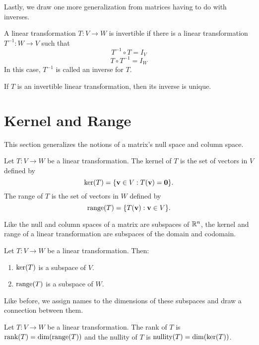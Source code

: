 \documentclass[../m73main.tex]{subfiles}
\begin{document}
Lastly, we draw one more generalization from matrices having to do with inverses.

\begin{definition}
	A linear transformation $T : V \to W$ is invertible if there is a linear transformation $T^{-1} : W \to V$ such that
	\[ T^{-1} \circ T = I_V \]
	\[ T \circ T^{-1} = I_W \]
	In this case, $T^{-1}$ is called an inverse for $T$.
\end{definition}

\begin{theorem}
	If $T$ is an invertible linear transformation, then its inverse is unique.
\end{theorem}

\section{Kernel and Range}
This section generalizes the notions of a matrix's null space and column space.

\begin{definition}
	Let $T : V \to W$ be a linear transformation.
	The kernel of $T$ is the set of vectors in $V$ defined by
	\[ \textrm{ker}(T) = \{\mathbf{v} \in V : T(\mathbf{v}) = \mathbf{0}\}. \]
	The range of $T$ is the set of vectors in $W$ defined by
	\[ \textrm{range}(T) = \{T(\mathbf{v}) : \mathbf{v} \in V\}. \]
\end{definition}

Like the null and column spaces of a matrix are subspaces of $\mathbb{R}^n$, the kernel and range of a linear transformation are subspaces of the domain and codomain.

\begin{theorem}
	Let $T : V \to W$ be a linear transformation.
	Then:
	\begin{enumerate}[label=(\alph*)]
		\item $\textrm{ker}(T)$ is a subspace of $V$.
		\item $\textrm{range}(T)$ is a subspace of $W$.
	\end{enumerate}
\end{theorem}

Like before, we assign names to the dimensions of these subspaces and draw a connection between them.

\begin{definition}
	Let $T : V \to W$ be a linear transformation.
	The rank of $T$ is $\textrm{rank}(T) = \dim (\textrm{range}(T))$ and the nullity of $T$ is $\textrm{nullity}(T) = \dim (\textrm{ker}(T))$.
\end{definition}
\end{document}
